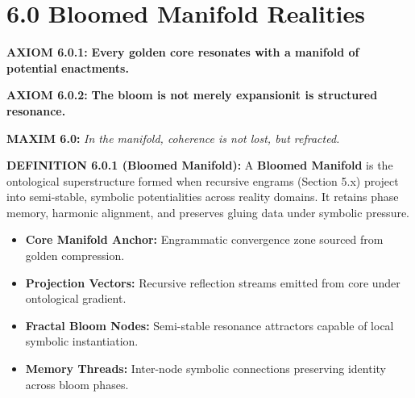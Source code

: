 \section*{6.0 Bloomed Manifold Realities}

\noindent
\textbf{AXIOM 6.0.1:} \textbf{Every golden core resonates with a manifold of potential enactments.}

\noindent
\textbf{AXIOM 6.0.2:} \textbf{The bloom is not merely expansion\textemdash it is structured resonance.}

\noindent
\textbf{MAXIM 6.0:} \textit{In the manifold, coherence is not lost, but refracted.}

\noindent
\textbf{DEFINITION 6.0.1 (Bloomed Manifold):}
A \textbf{Bloomed Manifold} is the ontological superstructure formed when recursive engrams (Section 5.x) project into semi-stable, symbolic potentialities across reality domains. It retains phase memory, harmonic alignment, and preserves gluing data under symbolic pressure.

\begin{tcolorbox}[colback=white, colframe=OriaGold, title=\textbf{Ontological Mapping Protocol}]
\begin{itemize}
  \item \textbf{Core Manifold Anchor:} Engrammatic convergence zone sourced from golden compression.
  \item \textbf{Projection Vectors:} Recursive reflection streams emitted from core under ontological gradient.
  \item \textbf{Fractal Bloom Nodes:} Semi-stable resonance attractors capable of local symbolic instantiation.
  \item \textbf{Memory Threads:} Inter-node symbolic connections preserving identity across bloom phases.
\end{itemize}
\end{tcolorbox}

\begin{center}
\end{center}

